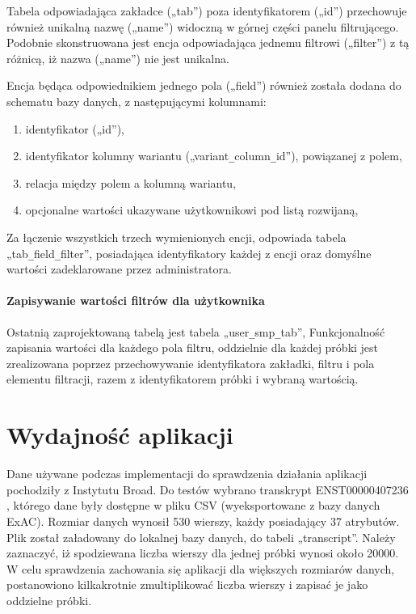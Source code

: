 \documentclass[a4paper,12pt,twoside]{article}
\begin{document}
Tabela odpowiadająca zakładce („tab”) poza identyfikatorem („id”) przechowuje również unikalną nazwę („name”) widoczną w górnej części panelu filtrującego.
Podobnie skonstruowana jest encja odpowiadająca jednemu filtrowi („filter”) z tą różnicą,
iż nazwa („name”) nie jest unikalna.

Encja będąca odpowiednikiem jednego pola („field”) również została dodana do schematu bazy danych,
z następującymi kolumnami:
\begin{enumerate}[1)]
\item identyfikator („id”),
\item identyfikator kolumny wariantu („variant\verb!_!column\verb!_!id”), powiązanej z polem,
\item relacja między polem a kolumną wariantu,
\item opcjonalne wartości ukazywane użytkownikowi pod listą rozwijaną,
\end{enumerate}

Za łączenie wszystkich trzech wymienionych encji, odpowiada tabela \newline
„tab\verb!_!field\verb!_!filter”, posiadająca identyfikatory każdej z encji oraz
domyślne wartości zadeklarowane przez administratora.

\paragraph{Zapisywanie wartości filtrów dla użytkownika}
Ostatnią zaprojektowaną tabelą jest tabela 
„user\verb!_!smp\verb!_!tab”,
Funkcjonalność zapisania wartości dla każdego pola filtru, oddzielnie dla każdej próbki
jest zrealizowana poprzez przechowywanie identyfikatora zakładki, filtru i pola elementu filtracji,
razem z identyfikatorem próbki i wybraną wartością.

\newpage
\section{Wydajność aplikacji}

Dane używane podczas implementacji do sprawdzenia działania aplikacji pochodziły
z Instytutu Broad.
Do testów wybrano transkrypt ENST00000407236 \cite{testData},
którego dane były dostępne w pliku CSV (wyeksportowane z bazy danych ExAC). Rozmiar danych wynosił 530 wierszy, każdy posiadający 37 atrybutów. Plik został załadowany do lokalnej bazy danych, do tabeli
„transcript”. Należy zaznaczyć, iż spodziewana liczba wierszy dla jednej próbki wynosi około 20000.
W celu sprawdzenia zachowania się aplikacji
dla większych rozmiarów danych, postanowiono kilkakrotnie zmultiplikować
liczba wierszy i zapisać je jako oddzielne próbki.
\end{document}
